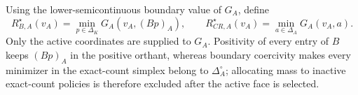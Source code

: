 Using the lower-semicontinuous boundary value of \(G_A\), define
\[
R_{B,A}^\star(v_A)=\min_{p\in\Delta_K}G_A(v_A,(Bp)_A),\qquad
R_{CR,A}^\star(v_A)=\min_{a\in\Delta_A}G_A(v_A,a).
\]
Only the active coordinates are supplied to \(G_A\).  Positivity of every entry of \(B\) keeps \((Bp)_A\) in the positive orthant, whereas boundary coercivity makes every minimizer in the exact-count simplex belong to \(\Delta_A^\circ\); allocating mass to inactive exact-count policies is therefore excluded after the active face is selected.
